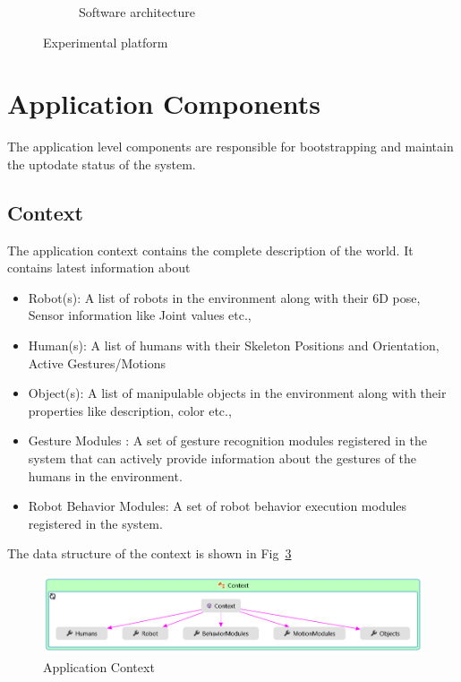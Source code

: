 \begin{figure}
\begin{subfigure}[t]{0.48\textwidth}
\caption[Software architecture]{Software architecture}
\label{fig:architecture}
\end{subfigure}
\caption[Experimental platform]{Experimental platform}
\label{fig:nao_localization}
\end{figure}
\section{Application Components}
\label{ssec:app_comp}
The application level components are responsible for bootstrapping and maintain the uptodate status of the system. 
\subsection*{Context}
The application context contains the complete description of the world. It contains latest information about
\begin{itemize}
\item Robot(s): A list of robots in the environment along with their 6D pose, Sensor information like Joint values etc.,
\item Human(s): A list of humans with their Skeleton Positions and Orientation, Active Gestures/Motions
\item Object(s): A list of manipulable objects in the environment along with their properties like description, color etc.,
\item Gesture Modules : A set of gesture recognition modules registered in the system that can actively provide information about the gestures of the humans in the environment.
\item Robot Behavior Modules: A set of robot behavior execution modules registered in the system.
\end{itemize}
The data structure of the context is shown in Fig~\ref{fig:system_context}
\begin{figure}
\centering
\includegraphics[width=\textwidth]{assets/context_diagram.png}
\caption[Application Context]{Application Context}
\label{fig:system_context}
\end{figure}
